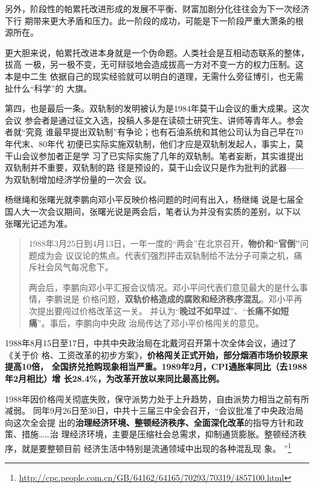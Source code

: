 另外，阶段性的帕累托改进形成的发展不平衡、财富加剧分化往往会为下一次经济下行
期带来更大矛盾和压力。此一阶段的成功，可能是下一阶段严重大萧条的根源所在。

更大胆来说，帕累托改进本身就是一个伪命题。人类社会是互相动态联系的整体，拔高
一极，另一极不变，无可辩驳地会造成拔高一方对不变一方的权力压制。这本是中二生
依据自己的现实经验就可以明白的道理，无需什么旁征博引，也无需扯什么“科学”的
大旗。

第四，也是最后一条。双轨制的发明被认为是1984年莫干山会议的重大成果。这次会议
参会者是通过征文入选，投稿人多是在读硕士研究生、讲师等青年人。参会者就“究竟
谁最早提出双轨制”有争论；也有石油系统和其他公司认为自己早在70年代末、80年代
初便已实际实施双轨制，他们才应是双轨制发起人，事实上，莫干山会议参加者正是学
习了已实际实施了几年的双轨制。笔者妄断，其实谁提出双轨制并不重要，双轨制的路
径是预设的，莫干山会议只是作为批判的武器——为双轨制增加经济学份量的一次会
议。

杨继绳\cite{yangshuanggui}和张曙光就李鹏向邓小平反映价格问题的时间有出入，杨继绳
说是七届全国人大一次会议期间，张曙光说是两会后，笔者认为并没有实质的差别，以下以
张曙光记述为准。
\begin{quotation}
  1988年3月25日到4月13日，一年一度的“两会”在北京召开，\textbf{物价和“官倒”}问题成为会
  议议论的焦点。代表们强烈抨击双轨制给不法分子可乘之机，痛斥社会风气每况愈下。

  两会后，李鹏向邓小平汇报会议情况。邓小平问代表们意见最大的是什么事情，李鹏说是
  价格问题，\textbf{双轨价格造成的腐败和经济秩序混乱}。邓小平再次提出要闯过价格改革这一关。
  并认为“\textbf{晚过不如早过}”、“\textbf{长痛不如短痛}”。事后，李鹏向中央政
  治局传达了邓小平价格闯关的意见。\cite[563]{fengyunshi1b}
\end{quotation}

1988年8月15日至17日，中共中央政治局在北戴河召开第十次全体会议，通过了《关于价
格、工资改革的初步方案》，\textbf{价格闯关正式开始，部分烟酒市场价较原来提高10倍，
  全国挤兑抢购现象相当严重。1989年2月，CPI通胀率同比（去1988年2月相比）增
  长28.4\%，为改革开放以来同比最高比例。}

1988年因价格闯关彻底失败，保守派势力处于上升趋势，自由派势力相当之前有所减弱。
同年9月26日至30日，中共十三届三中全会召开，“会议批准了中央政治局向这次全会提
出的\textbf{治理经济环境、整顿经济秩序、全面深化改革}的指导方针和政策、措施……治
理经济环境，主要是压缩社会总需求，抑制通货膨胀。整顿经济秩序，就是要整顿目前
经济生活中特别是流通领域中出现的各种混乱现
象。
”\footnote{\url{http://cpc.people.com.cn/GB/64162/64165/70293/70319/4857100.html}}

